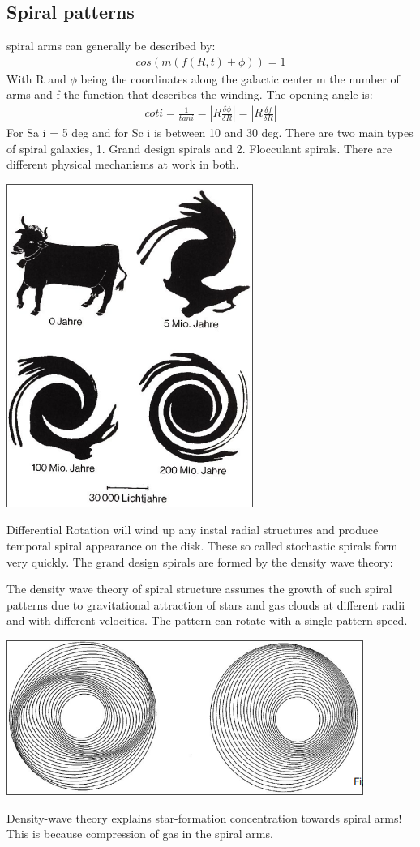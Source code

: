 \documentclass[11pt,a4paper]{article}
\begin{document}
\subsection{Spiral patterns}
spiral arms can generally be described by: 
\begin{align*}
   cos (m(f(R,t) + \phi ))  = 1
\end{align*}
With R and $\phi$ being the coordinates along the galactic center m the number of arms and f the function that describes the winding. 
The opening angle is:
\begin{align*}
    cot i = \frac 1 {tan i} = |R \frac {\delta \phi} {\delta R}| =  |R \frac {\delta f} {\delta R}|
\end{align*}
For Sa i = 5 deg and for Sc i is between 10 and 30 deg.
There are two main types of spiral galaxies, 1. Grand design spirals and 2. Flocculant spirals.
There are different physical mechanisms at work in both. 
\begin{center}
    \includegraphics[width=0.3\linewidth]{screenshot_2024-01-26-135659.png}
\end{center}
Differential Rotation will wind up any instal radial structures and produce temporal spiral appearance on the disk. 
These so called stochastic spirals form very quickly.
The grand design spirals are formed by the density wave theory:  

The density wave theory of spiral structure assumes the growth
of such spiral patterns due to gravitational attraction of stars and gas
clouds at different radii and with different velocities. The pattern can rotate with a single pattern speed.
\begin{center}
    \includegraphics[width=0.6\linewidth]{screenshot_2024-01-26-140627.png}
\end{center}
Density-wave theory explains star-formation concentration towards spiral arms!
This is because compression of gas in the spiral arms. 
\end{document}
